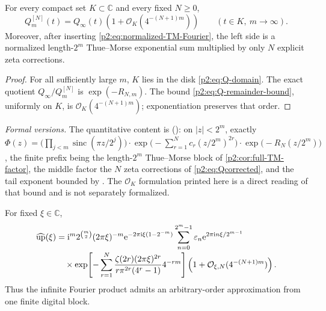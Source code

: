 \documentclass[11pt,oneside]{article}
\numberwithin{equation}{section}
\theoremstyle{definition}
\theoremstyle{remark}
\newcommand{\C}{\mathbb C}
\newcommand{\e}{\mathrm e}
\newcommand{\ii}{\mathrm i}
\newcommand{\bigO}{\mathcal O}
\newcommand{\sinc}{\operatorname{sinc}}
\newcommand{\eps}{\varepsilon}
\begin{document}
\begin{corollary}
\label{p2:cor:arbitrary-Q}
For every compact set $K\subset\C$ and every fixed $N\ge0$,
\begin{equation}
 Q_m^{[N]}(t)=Q_\infty(t)
 \left(1+\bigO_K(4^{-(N+1)m})\right)
 \qquad(t\in K,\ m\to\infty).
 \label{p2:eq:arbitrary-Q}
\end{equation}
Moreover, after inserting \eqref{p2:eq:normalized-TM-Fourier}, the left side is a normalized
length-$2^m$ Thue--Morse exponential sum multiplied by only $N$ explicit zeta corrections.
\newresult
\end{corollary}

\begin{proof}
For all sufficiently large $m$, $K$ lies in the disk \eqref{p2:eq:Q-domain}.  The exact quotient
$Q_\infty/Q_m^{[N]}$ is $\exp(-R_{N,m})$.  The bound
\eqref{p2:eq:Q-remainder-bound}, uniformly on $K$, is $\bigO_K(4^{-(N+1)m})$; exponentiation
preserves that order.
\end{proof}

\emph{Formal versions.}  The quantitative content is
(): on $|z|<2^m$, exactly
$\Phi(z)=\bigl(\prod_{j<m}\sinc(\pi z/2^j)\bigr)\cdot
\exp\bigl(-\sum_{r=1}^{N}c_r(z/2^m)^{2r}\bigr)\cdot\exp\bigl(-R_{N}(z/2^m)\bigr)$, the finite
prefix being the length-$2^m$ Thue--Morse block of \cref{p2:cor:full-TM-factor}, the middle
factor the $N$ zeta corrections of \eqref{p2:eq:Qcorrected}, and the tail exponent bounded by
.  The $\bigO_K$ formulation printed here is a direct
reading of that bound and is not separately formalized.

\begin{corollary}
\label{p2:cor:up-Fourier-block}
For fixed $\xi\in\C$,
\begin{align}
 \widehat\Up(\xi)
 &=\ii^m2^{\binom m2}(2\pi\xi)^{-m}
   \e^{-2\pi\ii\xi(1-2^{-m})}
   \sum_{n=0}^{2^m-1}\eps_n
   \e^{2\pi\ii n\xi/2^{m-1}}
 \notag\\[-0.2em]
 &\quad\times
 \exp\!\left[-\sum_{r=1}^{N}
 \frac{\zeta(2r)(2\pi\xi)^{2r}}{r\pi^{2r}(4^r-1)}4^{-rm}\right]
 \left(1+\bigO_{\xi,N}(4^{-(N+1)m})\right).
 \label{p2:eq:up-TM-approx}
\end{align}
Thus the infinite Fourier product admits an arbitrary-order approximation from one finite
digital block.
\end{corollary}
\end{document}
